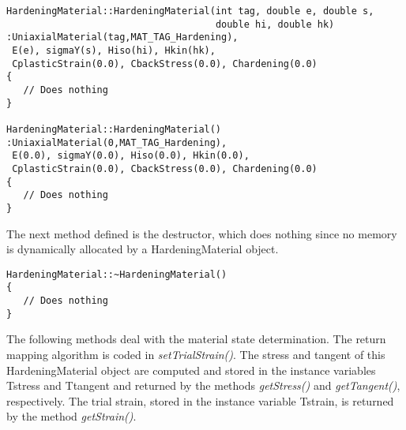 \documentclass[12pt]{article}
\begin{document}
{\sf\small
\begin{verbatim}
HardeningMaterial::HardeningMaterial(int tag, double e, double s,
                                     double hi, double hk)
:UniaxialMaterial(tag,MAT_TAG_Hardening),
 E(e), sigmaY(s), Hiso(hi), Hkin(hk),
 CplasticStrain(0.0), CbackStress(0.0), Chardening(0.0)
{
   // Does nothing
}

HardeningMaterial::HardeningMaterial()
:UniaxialMaterial(0,MAT_TAG_Hardening),
 E(0.0), sigmaY(0.0), Hiso(0.0), Hkin(0.0),
 CplasticStrain(0.0), CbackStress(0.0), Chardening(0.0)
{
   // Does nothing
}
\end{verbatim}
}

\noindent The next method defined is the destructor, which does nothing since no memory
is dynamically allocated by a HardeningMaterial object.

{\sf\small
\begin{verbatim}
HardeningMaterial::~HardeningMaterial()
{
   // Does nothing
}
\end{verbatim}
}

\noindent The following methods deal with the material state determination. The return
mapping algorithm is coded in {\em setTrialStrain()}. The stress and tangent of this
HardeningMaterial object are computed and stored in the instance variables Tstress
and Ttangent and returned by the methods {\em getStress()} and {\em getTangent()},
respectively. The trial strain, stored in the instance variable Tstrain, is returned
by the method {\em getStrain()}.
\end{document}
